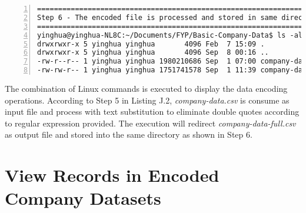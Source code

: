\begin{lstlisting}[breaklines, frame=single, numbers=left, caption={Execution of data encoding with stream editor.}, label=commandline-02]
===================================================================
Step 6 - The encoded file is processed and stored in same directory
===================================================================
yinghua@yinghua-NL8C:~/Documents/FYP/Basic-Company-Data$ ls -al 
drwxrwxr-x 5 yinghua yinghua       4096 Feb  7 15:09 .
drwxrwxr-x 5 yinghua yinghua       4096 Sep  8 00:16 ..
-rw-r--r-- 1 yinghua yinghua 1980210686 Sep  1 07:00 company-data.csv <-- Input file for encoding
-rw-rw-r-- 1 yinghua yinghua 1751741578 Sep  1 11:39 company-data-full.csv <-- Encoded file
\end{lstlisting} 

The combination of Linux commands is executed to display the data encoding operations. According to Step 5 in Listing J.2, \textit{company-data.csv} is consume as input file and process with text substitution to eliminate double quotes according to regular expression provided. The execution will redirect \textit{company-data-full.csv} as output file and stored into the same directory as shown in Step 6. 

\newpage

\section {View Records in Encoded Company Datasets}

